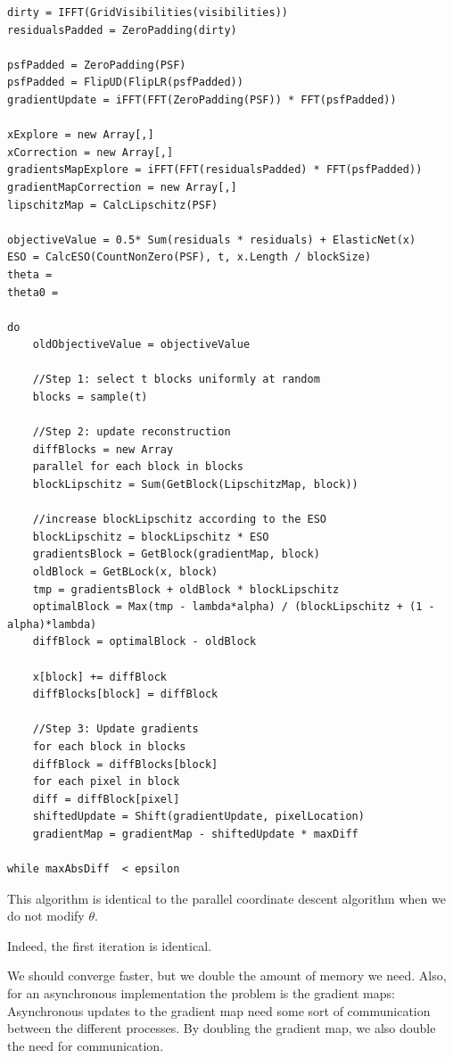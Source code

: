 \begin{lstlisting}
dirty = IFFT(GridVisibilities(visibilities))
residualsPadded = ZeroPadding(dirty)

psfPadded = ZeroPadding(PSF)
psfPadded = FlipUD(FlipLR(psfPadded))
gradientUpdate = iFFT(FFT(ZeroPadding(PSF)) * FFT(psfPadded))

xExplore = new Array[,]
xCorrection = new Array[,]
gradientsMapExplore = iFFT(FFT(residualsPadded) * FFT(psfPadded))
gradientMapCorrection = new Array[,]
lipschitzMap = CalcLipschitz(PSF)

objectiveValue = 0.5* Sum(residuals * residuals) + ElasticNet(x)
ESO = CalcESO(CountNonZero(PSF), t, x.Length / blockSize)
theta = 
theta0 = 

do 
	oldObjectiveValue = objectiveValue
	
	//Step 1: select t blocks uniformly at random
	blocks = sample(t)
	
	//Step 2: update reconstruction
	diffBlocks = new Array
	parallel for each block in blocks
	blockLipschitz = Sum(GetBlock(LipschitzMap, block))
	
	//increase blockLipschitz according to the ESO
	blockLipschitz = blockLipschitz * ESO
	gradientsBlock = GetBlock(gradientMap, block)
	oldBlock = GetBLock(x, block)
	tmp = gradientsBlock + oldBlock * blockLipschitz
	optimalBlock = Max(tmp - lambda*alpha) / (blockLipschitz + (1 - alpha)*lambda)
	diffBlock = optimalBlock - oldBlock
	
	x[block] += diffBlock
	diffBlocks[block] = diffBlock
	
	//Step 3: Update gradients
	for each block in blocks
	diffBlock = diffBlocks[block]
	for each pixel in block
	diff = diffBlock[pixel]
	shiftedUpdate = Shift(gradientUpdate, pixelLocation)
	gradientMap = gradientMap - shiftedUpdate * maxDiff

while maxAbsDiff  < epsilon
\end{lstlisting}

This algorithm is identical to the parallel coordinate descent algorithm when we do not modify $\theta$.

Indeed, the first iteration is identical.

We should converge faster, but we double the amount of memory we need.
Also, for an asynchronous implementation the problem is the gradient maps: Asynchronous updates to the gradient map need some sort of communication between the different processes. By doubling the gradient map, we also double the need for communication.

